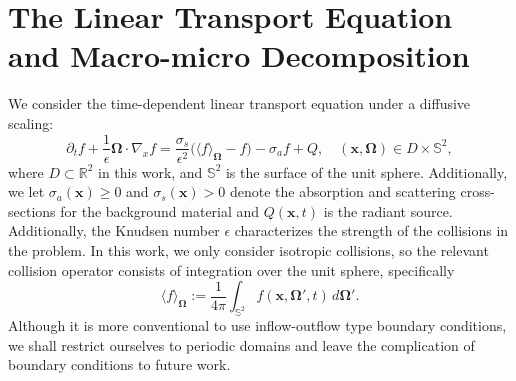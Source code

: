 \documentclass[onefignum,onetabnum]{siamart220329}
\begin{document}
 
\section{The Linear Transport Equation and Macro-micro Decomposition}
\label{sec:formulation}

We consider the time-dependent linear transport equation under a diffusive scaling:
\begin{equation}
    \partial_{t} f + \frac{1}{\epsilon} \mathbf{\Omega} \cdot \nabla_{x} f = \frac{\sigma_{s}}{\epsilon^{2}} \Big( \langle f \rangle_{\mathbf{\Omega}} - f \Big) - \sigma_{a} f + Q, \quad (\mathbf{x}, \mathbf{\Omega}) \in D \times \mathbb{S}^{2}, \label{eq:linear kinetic equation}
\end{equation}
where $D \subset \mathbb{R}^2$ in this work, and $\mathbb{S}^{2}$ is the surface of the unit sphere. Additionally, we let $\sigma_{a} \left(\mathbf{x}\right) \geq 0$ and $\sigma_{s} \left(\mathbf{x}\right) > 0$ denote the absorption and scattering cross-sections for the background material and $Q(\mathbf{x}, t)$ is the radiant source. Additionally, the Knudsen number $\epsilon$ characterizes the strength of the collisions in the problem. In this work, we only consider isotropic collisions, so the relevant collision operator consists of integration over the unit sphere, specifically
\begin{equation*}
    \langle f \rangle_{\mathbf{\Omega}} := \frac{1}{4\pi} \int_{\mathbb{S}^{2}} f \left( \mathbf{x}, \mathbf{\Omega}', t \right)  \, d\mathbf{\Omega}'.
\end{equation*}
Although it is more conventional to use inflow-outflow type boundary conditions, we shall restrict ourselves to periodic domains and leave the complication of boundary conditions to future work.
\end{document}
